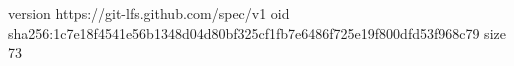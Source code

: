 version https://git-lfs.github.com/spec/v1
oid sha256:1c7e18f4541e56b1348d04d80bf325cf1fb7e6486f725e19f800dfd53f968c79
size 73
